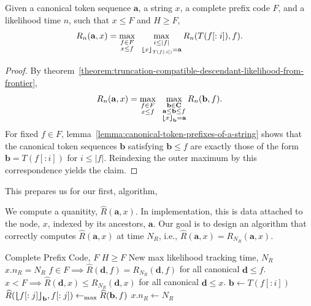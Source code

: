 \begin{corollary}
    Given a canonical token sequence $\mathbf{a}$, a string $x$, a complete prefix code $F$,
    and a likelihood time $n$,
    such that $x \leq F$ and $H \geq F$,
    $$
    R_n(\mathbf{a}, x)
    =
    \max_{\substack{
        f \in F \\
        x \leq f
    }}
    \;\;
    \max_{\substack{
        i \leq |f| \\
        {\bm{\lfloor}} x {\bm{\rfloor}}_{T(f[:i])} = \mathbf{a}
    }}
    R_n(T(f[:i]), f).
    $$
\end{corollary}
\begin{proof}
    By theorem~\ref{theorem:truncation-compatible-descendant-likelihood-from-frontier},
    $$
    R_n(\mathbf{a}, x) =
    \max_{\substack{
        f \in F \\
        x \leq f
    }}
    \;\;
    \max_{\substack{
        \mathbf{b} \in \mathbf{C} \\
        \mathbf{a} \leq \mathbf{b} \leq f \\
        {\bm{\lfloor}} x {\bm{\rfloor}}_{\mathbf{b}} = \mathbf{a}
    }}
    R_n(\mathbf{b}, f).
    $$
    For fixed $f \in F$, lemma~\ref{lemma:canonical-token-prefixes-of-a-string}
    shows that the canonical token sequences $\mathbf{b}$ satisfying $\mathbf{b} \leq f$
    are exactly those of the form $\mathbf{b} = T(f[:i])$ for $i \leq |f|$.
    Reindexing the outer maximum by this correspondence yields the claim.
\end{proof}
This prepares us for our first, algorithm,

We compute a quanitity, $\widehat{R}(\mathbf{a}, x)$.
In implementation, this is data attached to the node, $x$,
indexed by its ancestors, $\mathbf{a}$.
Our goal is to design an algorithm that correctly computes $\widehat{R}(\mathbf{a}, x)$
at time $N_R$,
i.e., $\widehat{R}(\mathbf{a}, x) = R_{N_R}(\mathbf{a}, x)$.

\begin{algorithm}[H]
\caption{MTCDL Up Propagation}
\label{alg:mtcdl-up-propagation}
\begin{algorithmic}[1]
\Require Complete Prefix Code, $F$
\Require $H \geq F$
\Require New max likelihood tracking time, $N_R$
\Require $x.n_R = N_R$
\Require $f \in F \implies \widehat{R}(\mathbf{d}, f) = R_{N_R}(\mathbf{d}, f)$ for all canonical $\mathbf{d} \leq f$.
\Require $x < F \implies \widehat{R}(\mathbf{d}, x) \leq R_{N_R}(\mathbf{d}, x)$ for all canonical $\mathbf{d} \leq x$.
        \State $\mathbf{b} \gets T(f[:i])$
            \State $\widehat{R}({\bm{\lfloor}} f[:j] {\bm{\rfloor}}_{\mathbf{b}}, f[:j]) \gets_{\max} \widehat{R}(\mathbf{b}, f)$
        \EndFor
    \EndFor
\EndFor
{}
    \State $x.n_R \gets N_R$
\EndFor
\end{algorithmic}
\end{algorithm}

